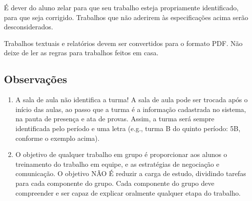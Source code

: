 \documentclass[a4paper]{article}
\begin{document}
É dever do aluno zelar para que seu trabalho esteja propriamente
identificado, para que seja corrigido. Trabalhos que não aderirem às
especificações acima serão desconsiderados.
 
Trabalhos textuais e relatórios devem ser convertidos para o formato
PDF. Não deixe de ler as regras para trabalhos feitos em casa.

\subsection{Observações}

\begin{enumerate}
\item A sala de aula não identifica a turma! A sala de aula pode ser
  trocada após o início das aulas, ao passo que a turma é a informação
  cadastrada no sistema, na pauta de presença e ata de provas. Assim,
  a turma será sempre identificada pelo período e uma letra (e.g.,
  turma B do quinto período: 5B, conforme o exemplo acima).
\item O objetivo de qualquer trabalho em grupo é proporcionar aos
  alunos o treinamento do trabalho em equipe, e as estratégias de
  negociação e comunicação. O objetivo NÃO É reduzir a carga de
  estudo, dividindo tarefas para cada componente do grupo. Cada
  componente do grupo deve compreender e ser capaz de explicar
  oralmente qualquer etapa do trabalho.

\end{enumerate}

 
\end{document}
